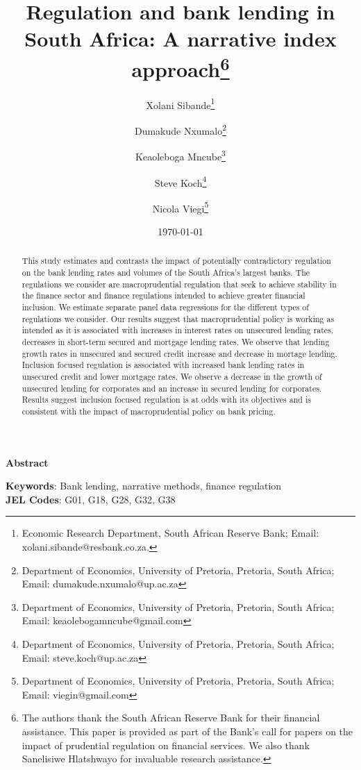 \title{Regulation and bank lending in South Africa: A narrative index approach\thanks{The authors thank the South African Reserve Bank for their financial assistance. This paper is provided as part of the Bank's call for papers on the impact of prudential regulation on financial services. We also thank Sanelisiwe Hlatshwayo for invaluable research assistance.}}

\author {Xolani Sibande\footnote{Economic Research Department, South African Reserve Bank; Email: xolani.sibande@resbank.co.za.} \and
Dumakude Nxumalo\footnote{Department of Economics, University of Pretoria, Pretoria, South Africa; Email: dumakude.nxumalo@up.ac.za} \and
Keaoleboga Mncube\footnote{Department of Economics, University of Pretoria, Pretoria, South Africa; Email: keaolebogamncube@gmail.com} \and
Steve Koch\footnote{Department of Economics, University of Pretoria, Pretoria, South Africa; Email: steve.koch@up.ac.za} \and
Nicola Viegi\footnote{Department of Economics, University of Pretoria, Pretoria, South Africa; Email: viegin@gmail.com}}

\date{\today}
\maketitle

\begin{center}
\textbf{Abstract}
\end{center}

\begin{abstract}
This study estimates and contrasts the impact of potentially contradictory regulation on the bank lending rates and volumes of the South Africa's largest banks. The regulations we consider are macroprudential regulation that seek to achieve stability in the finance sector and finance regulations intended to achieve greater financial inclusion.  We estimate separate panel data regressions for the different types of regulations we consider. Our results suggest that macroprudential policy is working as intended as it is associated with increases in interest rates on unsecured lending rates, decreases in short-term secured and mortgage lending rates. We observe that lending growth rates in unsecured and secured credit increase and decrease in mortage lending. Inclusion focused regulation is associated with increased bank lending rates in unsecured credit and lower mortgage rates. We observe a decrease in the growth of unsecured lending for corporates and an increase in secured lending for corporates. Results suggest inclusion focused regulation is at odds with its objectives and is consistent with the impact of macroprudential policy on bank pricing.
\end{abstract}


\noindent\textbf{Keywords}: Bank lending, narrative methods, finance regulation\\
\textbf{JEL Codes}: G01, G18, G28, G32, G38
\newpage